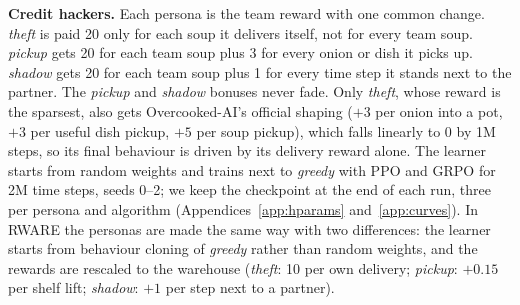 \documentclass[letterpaper]{article} %
\begin{document}
\textbf{Credit hackers.} Each persona is the team reward with one common change. \emph{theft} is paid 20 only for
each soup it delivers itself, not for every team soup. \emph{pickup} gets 20 for each team soup plus 3 for every
onion or dish it picks up. \emph{shadow} gets 20 for each team soup plus 1 for every time step it stands next to the
partner. The \emph{pickup} and \emph{shadow} bonuses never fade. Only \emph{theft}, whose reward is the sparsest,
also gets Overcooked-AI's official shaping ($+3$ per onion into a pot, $+3$ per useful dish pickup,
$+5$ per soup pickup), which falls linearly to 0 by 1M steps, so its final behaviour is driven by its delivery reward
alone. The learner starts from random weights and trains next to \emph{greedy} with PPO
\cite{schulman2017ppo} and GRPO \cite{shao2024deepseekmath} for 2M time steps, seeds 0--2; we keep the checkpoint at
the end of each run, three per persona and algorithm (Appendices~\ref{app:hparams} and~\ref{app:curves}). In RWARE the
personas are made the same way with two differences: the learner starts from behaviour cloning of \emph{greedy}
rather than random weights, and the rewards are rescaled to the warehouse (\emph{theft}: 10 per own delivery;
\emph{pickup}: $+0.15$ per shelf lift; \emph{shadow}: $+1$ per step next to a partner).
\end{document}
